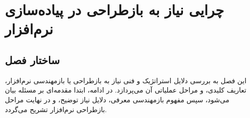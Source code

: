 \chapter{چرایی نیاز به بازطراحی در پیاده‌سازی نرم‌افزار}
\label{ch:chapter4}

\section{ساختار فصل}
این فصل به بررسی دلایل استراتژیک و فنی نیاز به بازطراحی یا بازمهندسی نرم‌افزار، تعاریف کلیدی، و مراحل عملیاتی آن می‌پردازد. در ادامه، ابتدا مقدمه‌ای بر مسئله بیان می‌شود، سپس مفهوم بازمهندسی معرفی، دلایل نیاز توضیح، و در نهایت مراحل بازطراحی نرم‌افزار تشریح می‌گردد.









